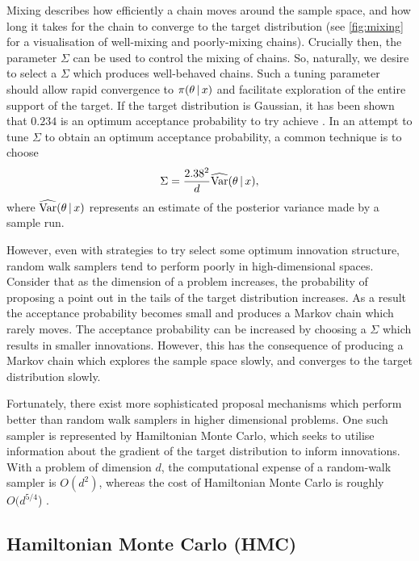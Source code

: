 Mixing describes how efficiently a chain moves around the sample space, and how
long it takes for the chain to converge to the target distribution (see
\cref{fig:mixing} for a visualisation of well-mixing and poorly-mixing chains).
Crucially then, the parameter $\Sigma$ can be used to control the mixing of
chains. So, naturally, we desire to select a $\Sigma$ which produces
well-behaved chains. Such a tuning parameter should allow rapid convergence to
$\pi(\theta \,|\, x)$ and facilitate exploration of the entire support of the
target. If the target distribution is Gaussian, it has been shown that $0.234$
is an optimum acceptance probability to try achieve \parencite{roberts01}. In
an attempt to tune $\Sigma$ to obtain an optimum acceptance probability, a
common technique is to choose 
\begin{equation*}
  \Sigma = \frac{2.38^2}{d} \widehat{\text{Var}}(\theta \,|\, x),
\end{equation*}
where $\widehat{\text{Var}}(\theta \,|\, x)$ represents an estimate of the
posterior variance made by a sample run.

However, even with strategies to try select some optimum innovation structure,
random walk samplers tend to perform poorly in high-dimensional spaces.
Consider that as the dimension of a problem increases, the probability of
proposing a point out in the tails of the target distribution increases. As a
result the acceptance probability becomes small and produces a Markov chain
which rarely moves. The acceptance probability can be increased by choosing a
$\Sigma$ which results in smaller innovations. However, this has the
consequence of producing a Markov chain which explores the sample space slowly,
and converges to the target distribution slowly.

Fortunately, there exist more sophisticated proposal mechanisms which perform
better than random walk samplers in higher dimensional problems. One such
sampler is represented by Hamiltonian Monte Carlo, which seeks to utilise
information about the gradient of the target distribution to inform
innovations. With a problem of dimension $d$, the computational expense of a
random-walk sampler is $O(d^2)$, whereas the cost of Hamiltonian Monte Carlo is
roughly $O(d^{5/4}$) \parencite{creutz88}. 

\subsection{Hamiltonian Monte Carlo (HMC)}
\label{ssec:hmc}


